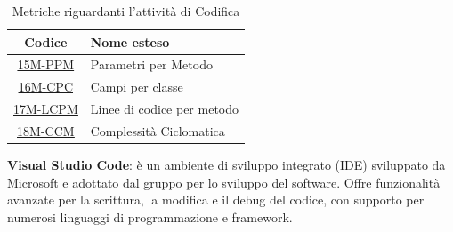 \begin{table}[!h]
	\centering
	\begin{tabular}{|c|l|}
		\hline
		\textbf{Codice}                       & \textbf{Nome esteso}       \\
		\hline
		\underline{\hyperlink{15M}{15M-PPM}}  & Parametri per Metodo       \\
		\underline{\hyperlink{16M}{16M-CPC}}  & Campi per classe           \\
		\underline{\hyperlink{17M}{17M-LCPM}} & Linee di codice per metodo \\
		\underline{\hyperlink{18M}{18M-CCM}}  & Complessità Ciclomatica    \\
		\hline
	\end{tabular}
	\caption{Metriche riguardanti l'attività di Codifica}
\end{table}

\textbf{Visual Studio Code}: è un ambiente di sviluppo integrato (IDE) sviluppato da Microsoft e adottato dal gruppo per lo sviluppo del software. Offre funzionalità avanzate per la scrittura, la modifica e il debug del codice, con supporto per numerosi linguaggi di programmazione e framework.

\newpage
